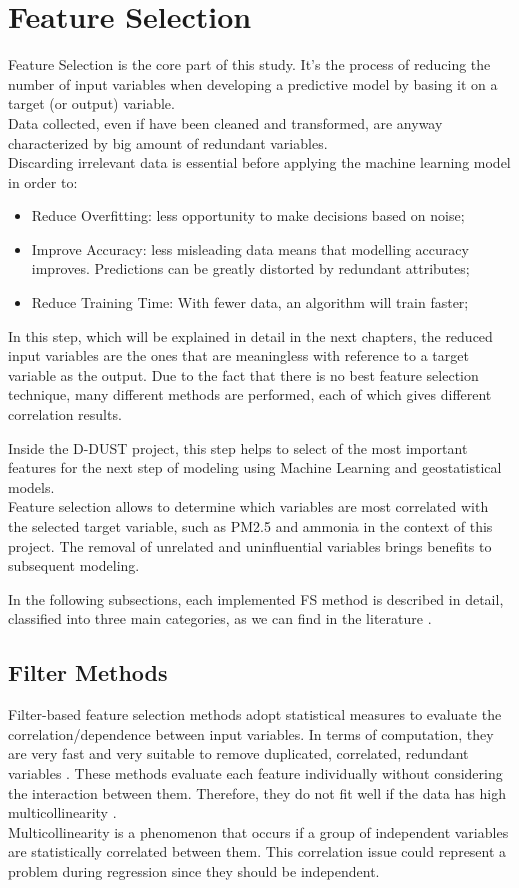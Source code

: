 \section{Feature Selection}
Feature Selection is the core part of this study. It's the process of reducing the number of input variables when developing a predictive model by basing it on a target (or output) variable. \\
Data collected, even if have been cleaned and transformed, are anyway characterized by big amount of redundant variables.\\
Discarding irrelevant data is essential before applying the machine learning model in order to:
\begin{itemize}
\item Reduce Overfitting: less opportunity to make decisions based on noise;
\item Improve Accuracy: less misleading data means that modelling accuracy improves. Predictions can be greatly distorted by redundant attributes;
\item Reduce Training Time: With fewer data, an algorithm will train faster;
\end{itemize}
In this step, which will be explained in detail in the next chapters, the reduced input variables are the ones that are meaningless with reference to a target variable as the output. \newline
Due to the fact that there is no best feature selection technique, many different methods are performed, each of which gives different correlation results.\par
Inside the D-DUST project, this step helps to select of the most important features for the next step of modeling using Machine Learning and geostatistical models. \\
Feature selection allows to determine which variables are most correlated with the selected target variable, such as PM2.5 and ammonia in the context of this project. 
The removal of unrelated and uninfluential variables brings benefits to subsequent modeling.
\par
In the following subsections, each implemented FS method is described in detail, classified into three main categories, as we can find in the literature \cite{stanczyk2015feature}.
\subsection{Filter Methods}
Filter-based feature selection methods adopt statistical measures to evaluate the correlation/dependence between input variables.\newline
In terms of computation, they are very fast and very suitable to remove duplicated, correlated, redundant variables \cite{saeys2007review}. \newline
These methods evaluate each feature individually without considering the interaction between them. Therefore, they do not fit well if the data has high multicollinearity \cite{daoud2017multicollinearity}.\\
Multicollinearity is a phenomenon that occurs if a group of independent variables are statistically correlated between them. 
This correlation issue could represent a problem during regression since they should be independent. 

